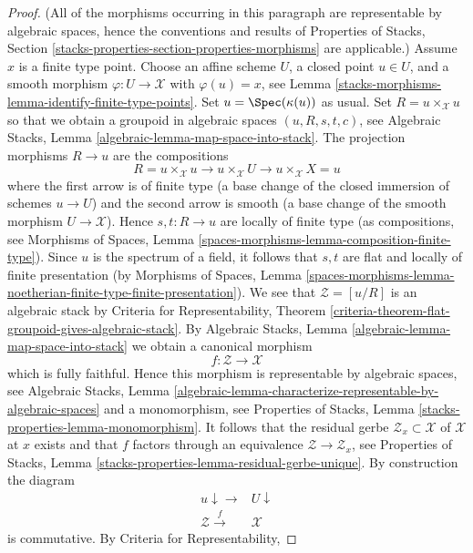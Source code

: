 \begin{proof}
(All of the morphisms occurring in this paragraph are representable
by algebraic spaces, hence the conventions and results of
Properties of Stacks,
Section \ref{stacks-properties-section-properties-morphisms}
are applicable.)
Assume $x$ is a finite type point. Choose an affine scheme $U$,
a closed point $u \in U$, and a smooth morphism $\varphi : U \to \mathcal{X}$
with $\varphi(u) = x$, see
Lemma \ref{stacks-morphisms-lemma-identify-finite-type-points}.
Set $u = \Spec(\kappa(u))$ as usual. Set $R = u \times_\mathcal{X} u$
so that we obtain a groupoid in algebraic spaces
$(u, R, s, t, c)$, see
Algebraic Stacks, Lemma \ref{algebraic-lemma-map-space-into-stack}.
The projection morphisms $R \to u$ are the compositions
$$
R = u \times_\mathcal{X} u \to
u \times_\mathcal{X} U \to
u \times_\mathcal{X} X = u
$$
where the first arrow is of finite type (a base change of the closed
immersion of schemes $u \to U$) and the second arrow is smooth (a base
change of the smooth morphism $U \to \mathcal{X}$). Hence
$s, t : R \to u$ are locally of finite type (as compositions, see
Morphisms of Spaces,
Lemma \ref{spaces-morphisms-lemma-composition-finite-type}).
Since $u$ is the spectrum of a field, it follows that
$s, t$ are flat and locally of finite presentation (by
Morphisms of Spaces, Lemma
\ref{spaces-morphisms-lemma-noetherian-finite-type-finite-presentation}).
We see that $\mathcal{Z} = [u/R]$ is an algebraic stack by
Criteria for Representability,
Theorem \ref{criteria-theorem-flat-groupoid-gives-algebraic-stack}.
By
Algebraic Stacks, Lemma \ref{algebraic-lemma-map-space-into-stack}
we obtain a canonical morphism
$$
f : \mathcal{Z} \longrightarrow \mathcal{X}
$$
which is fully faithful. Hence this morphism is representable by
algebraic spaces, see
Algebraic Stacks, Lemma
\ref{algebraic-lemma-characterize-representable-by-algebraic-spaces}
and a monomorphism, see
Properties of Stacks, Lemma \ref{stacks-properties-lemma-monomorphism}.
It follows that the residual gerbe $\mathcal{Z}_x \subset \mathcal{X}$
of $\mathcal{X}$ at $x$ exists and that $f$ factors through an
equivalence $\mathcal{Z} \to \mathcal{Z}_x$, see
Properties of Stacks, Lemma
\ref{stacks-properties-lemma-residual-gerbe-unique}.
By construction the diagram
$$
\begin{array}{cc}u \downarrow\longrightarrow & U \downarrow \\ \mathcal{Z} \overset{f}{\longrightarrow} & \mathcal{X}\end{array}
$$
is commutative. By
Criteria for Representability,

\end{proof}
